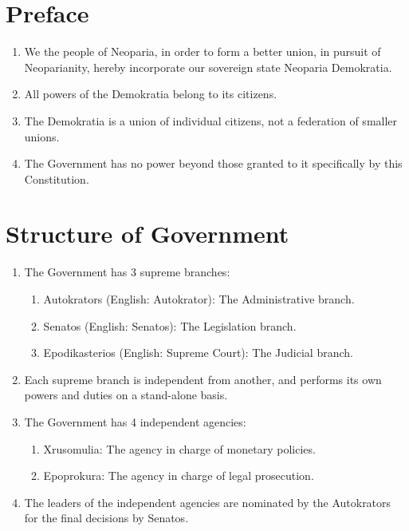 







\section*{Preface}
\begin{enumerate}
	\item We the people of Neoparia, in order to form a better union, in pursuit of Neoparianity, hereby incorporate our sovereign state Neoparia Demokratia.
	\item All powers of the Demokratia belong to its citizens.
	\item The Demokratia is a union of individual citizens, not a federation of smaller unions.
	\item The Government has no power beyond those granted to it specifically by this Constitution.
\end{enumerate}





\section{Structure of Government}
\begin{enumerate}[start=101]
	\item The Government has 3 supreme branches:
	      \begin{enumerate}
		      \item Autokrators (English: Autokrator): The Administrative branch.
		      \item Senatos (English: Senatos): The Legislation branch.
		      \item Epodikasterios (English: Supreme Court): The Judicial branch.
	      \end{enumerate}
	\item Each supreme branch is independent from another, and performs its own powers and duties on a stand-alone basis.
	\item The Government has 4 independent agencies:
	      \begin{enumerate}
		      \item Xrusomulia: The agency in charge of monetary policies.
		      \item Epoprokura: The agency in charge of legal prosecution.
	      \end{enumerate}
	\item The leaders of the independent agencies are nominated by the Autokrators for the final decisions by Senatos.
\end{enumerate}





